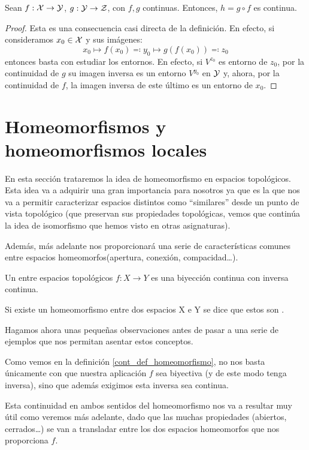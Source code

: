 \begin{prop}
	Sean $f:\mathcal{X}\to\mathcal{Y}$, $g:\mathcal{Y}\to\mathcal{Z}$, con $f,g$ continuas. Entonces, $h = g\circ f$ es continua.
	
	\begin{proof}
		Esta es una consecuencia casi directa de la definición. En efecto, si consideramos $x_0\in\mathcal{X}$ y sus imágenes:
		\[x_0\mapsto f(x_0)\eqqcolon y_0\mapsto g(f(x_0))\eqqcolon z_0\]
		entonces basta con estudiar los entornos. En efecto, si $V^{z_0}$ es entorno de $z_0$, por la continuidad de $g$ su imagen inversa es un entorno $V^{y_0}$ en $\mathcal{Y}$ y, ahora, por la continuidad de $f$, la imagen inversa de este último es un entorno de $x_0$.
	\end{proof}
\end{prop}

\section{Homeomorfismos y homeomorfismos locales}
\label{cont_homeomorfismos}

En esta sección trataremos la idea de homeomorfismo en espacios topológicos. Esta idea va a adquirir una gran importancia para nosotros ya que es la que nos va a permitir caracterizar espacios distintos como ``similares'' desde un punto de vista topológico (que preservan sus propiedades topológicas, vemos que continúa la idea de isomorfismo que hemos visto en otras asignaturas).


Además, más adelante nos proporcionará una serie de características comunes entre espacios homeomorfos(apertura, conexión, compacidad\dots).

\label{cont_def_homeomorfismo}

\begin{defi}[Homeomorfismo]
	Un  entre espacios topológicos $f\colon X\rightarrow Y$ es una biyección continua con inversa continua.
	
	Si existe un homeomorfismo entre dos espacios X e Y se dice que estos son .
\end{defi}

Hagamos ahora unas pequeñas observaciones antes de pasar a una serie de ejemplos que nos permitan asentar estos conceptos.

\label{cont_obs_defHomeomorfismo}
\begin{obs}
	Como vemos en la definición \ref{cont_def_homeomorfismo}, no nos basta únicamente con que nuestra aplicación $f$ sea biyectiva (y de este modo tenga inversa), sino que además exigimos esta inversa sea continua. 
	
	Esta continuidad en ambos sentidos del homeomorfismo nos va a resultar muy útil como veremos más adelante, dado que las muchas propiedades (abiertos, cerrados\dots) se van a transladar entre los dos espacios homeomorfos que nos proporciona $f$.
\end{obs}

